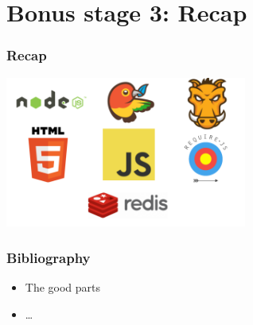 \section{Bonus stage 3: Recap}

\begin{frame}[fragile]
  \frametitle{Recap}

  \begin{center}
    \includegraphics[width=300px]{images/recap.png}
  \end{center}
\end{frame}

\begin{frame}[fragile]
  \frametitle{Bibliography}

  \begin{itemize}
    \item The good parts
    \item \ldots
  \end{itemize}
\end{frame}

